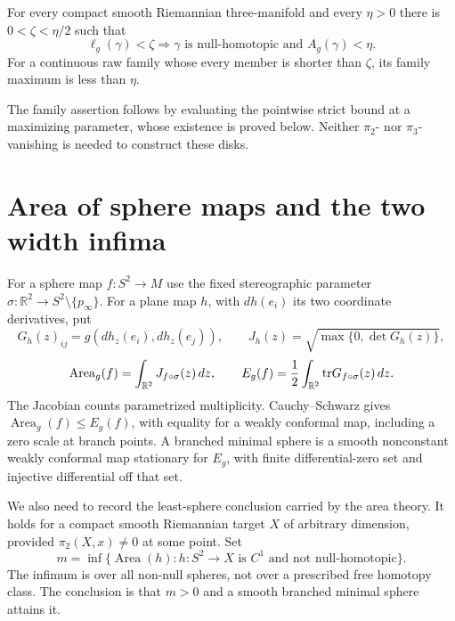\begin{proposition}
\label{prop:filling-short-area}
For every compact smooth Riemannian three-manifold and every $\eta>0$ there is
$0<\zeta<\eta/2$ such that
\[
 \ell_g(\gamma)<\zeta\Longrightarrow
 \gamma\text{ is null-homotopic and }A_g(\gamma)<\eta.
\]
For a continuous raw family whose every member is shorter than $\zeta$,
its family maximum is less than $\eta$.
\end{proposition}

The family assertion follows by evaluating the pointwise strict bound at
a maximizing parameter, whose existence is proved below. Neither
$\pi_2$- nor $\pi_3$-vanishing is needed to construct these disks.

\section{Area of sphere maps and the two width infima}
\label{sec:filling-width-definitions}

For a sphere map $f:S^2\to M$ use the fixed stereographic parameter
$\sigma:\mathbb R^2\to S^2\setminus\{p_\infty\}$. For a plane map $h$,
with $dh(e_i)$ its two coordinate derivatives, put
\[
 G_h(z)_{ij}=g(dh_z(e_i),dh_z(e_j)),\qquad
 J_h(z)=\sqrt{\max\{0,\det G_h(z)\}},
\]
\[
 {\rm Area}_g(f)=\int_{\mathbb R^2}J_{f\circ\sigma}(z)\,dz,\qquad
 E_g(f)=\frac12\int_{\mathbb R^2}{\rm tr}G_{f\circ\sigma}(z)\,dz.
\]
The Jacobian counts parametrized multiplicity. Cauchy--Schwarz gives
$\operatorname{Area}_g(f)\leq E_g(f)$, with equality for a weakly conformal map, including a zero
scale at branch points. A branched minimal sphere is a smooth nonconstant
weakly conformal map stationary for $E_g$, with finite differential-zero set and
injective differential off that set.

We also need to record the least-sphere conclusion carried by the area
theory. It holds for a compact smooth Riemannian target $X$ of arbitrary
dimension, provided $\pi_2(X,x)\ne0$ at some point. Set
\[
 m=\inf\{\operatorname{Area}(h):h:S^2\to X\text{ is }C^1
                         \text{ and not null-homotopic}\}.
\]
The infimum is over all non-null spheres, not over a prescribed free
homotopy class. The conclusion is that $m>0$ and a smooth branched
minimal sphere attains it.

